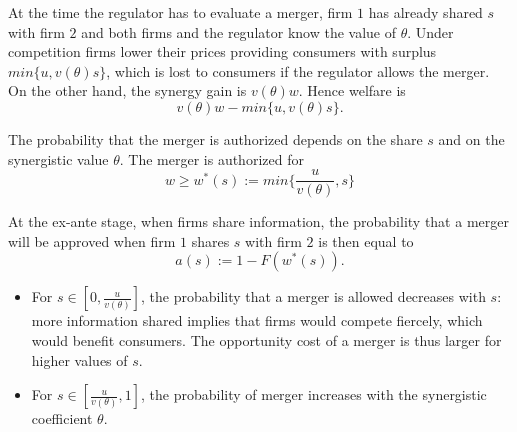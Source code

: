 \documentclass[a4paper,leqno]{article}%
\renewcommand{\t}{\theta}
\begin{document}
\medskip

At the time the regulator has to evaluate a merger, firm $1$ has already shared $s$ with firm $2$ and both firms and the regulator know the value of $\t$. Under competition firms lower their prices providing consumers with surplus $min\{u,v(\t)s\}$, which is lost to consumers if the regulator allows the merger. On the other hand, the synergy gain is $v(\t)w$. Hence welfare is
$$v(\t)w-min\{u,v(\t)s\}.$$


The probability that the merger is authorized depends on the share $s$ and on the synergistic value $\t$. The merger is authorized for 
    \begin{equation}
           w\geq w^*(s):=min\{\frac{u}{v(\t)},s\}
    \end{equation}


At the ex-ante stage, when firms share information, the probability that a merger will be approved when firm $1$ shares $s$ with firm $2$ is then equal to  
\[
a(s):=1-F(w^*(s)).
\]

\begin{itemize}
    \item For $s\in[0,\frac{u}{v(\t)}]$, the probability that a merger is allowed decreases with $s$: more information shared implies that firms would compete fiercely, which would benefit consumers. The opportunity cost of a merger is thus larger for higher values of $s$.
    \item For $s\in[\frac{u}{v(\t)},1]$, the probability of merger increases with the synergistic coefficient $\t$.
\end{itemize}





\end{document}

